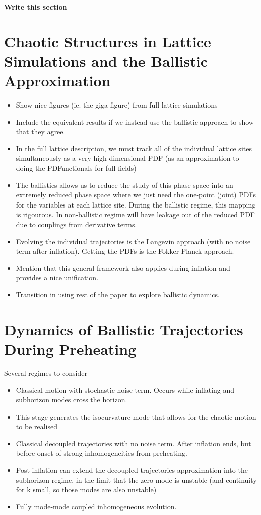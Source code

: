 \documentclass[11pt,a4paper]{article}
\begin{document}
{\bf Write this section}

\section{Chaotic Structures in Lattice Simulations and the Ballistic Approximation}
\begin{itemize}
\item Show nice figures (ie. the giga-figure) from full lattice simulations
\item Include the equivalent results if we instead use the ballistic approach to show that they agree.
\item In the full lattice description, we must track all of the individual lattice sites simultaneously as a very high-dimensional PDF (as an approximation to doing the PDFunctionals for full fields)
\item The ballistics allows us to reduce the study of this phase space into an extremely reduced phase space where we just need the one-point (joint) PDFs for the variables at each lattice site.  During the ballistic regime, this mapping is rigourous.  In non-ballistic regime will have leakage out of the reduced PDF due to couplings from derivative terms.
\item Evolving the individual trajectories is the Langevin approach (with no noise term after inflation).  Getting the PDFs is the Fokker-Planck approach.
\item Mention that this general framework also applies during inflation and provides a nice unification.
\item Transition in using rest of the paper to explore ballistic dynamics.
\end{itemize}

\section{Dynamics of Ballistic Trajectories During Preheating}
Several regimes to consider
\begin{itemize}
\item Classical motion with stochastic noise term.  Occurs while inflating and subhorizon modes cross the horizon.
\item This stage generates the isocurvature mode that allows for the chaotic motion to be realised
\item Classical decoupled trajectories with no noise term.  After inflation ends, but before onset of strong inhomogeneities from preheating.
\item Post-inflation can extend the decoupled trajectories approximation into the subhorizon regime, in the limit that the zero mode is unstable (and continuity for k small, so those modes are also unstable)
\item Fully mode-mode coupled inhomogeneous evolution.
\end{itemize}
\end{document}
